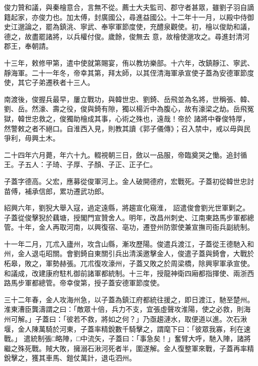 \begin{pinyinscope}
 俊力贊和議，與秦檜意合，言無不從。薦士大夫監司、郡守者甚眾，雖劉子羽自謫籍起家，亦俊力也。加太傅，封廣國公，尋進益國公。十二年十一月，以殿中侍御史江邈論之，罷為鎮洮、寧武、奉寧軍節度使，充醴泉觀使。初，檜以俊助和議，德之，故盡罷諸將，以兵權付俊。歲餘，俊無去
 意，故檜使邈攻之。尋進封清河郡王，奉朝請。



 十三年，敕修甲第，遣中使就第賜宴，侑以教坊樂部。十六年，改鎮靜江、寧武、靜海軍。二十一年冬，帝幸其第，拜太師，以其侄清海軍承宣使子蓋為安德軍節度使，其它子弟遷秩者十三人。



 南渡後，俊握兵最早，屢立戰功，與韓世忠、劉錡、岳飛並為名將，世稱張、韓、劉、岳。然濠、壽之役，俊與錡有隙，獨以楊沂中為腹心，故有濠梁之劫。岳飛冤獄，韓世忠救之，俊獨助檜成其事，心術之殊也，遠哉！帝於
 諸將中眷俊特厚，然警敕之者不絕口。自淮西入見，則教其讀《郭子儀傳》；召入禁中，戒以毋與民爭利，毋興土木。



 二十四年六月薨，年六十九。輟視朝三日，斂以一品服，帝臨奠哭之慟。追封循王。子五人：子琦、子厚、子顏、子正、正子仁。



 子蓋字德高。父宏，應募從俊軍河上。金人破開德府，宏戰死。子蓋初從韓世忠討苗傅，補承信郎，累功遷武功郎。



 紹興六年，劉猊大舉入寇，過定遠縣，將趨宣化窺淮，
 詔遣俊會劉光世軍剿之。子蓋從俊擊猊於藕塘，授閣門宣贊舍人。明年，改昌州刺史、江南東路馬步軍都總管。十年，金人再取河南，以興復宿、亳功，遷登州防禦使兼宣撫司衙兵副統制。



 十一年二月，兀朮入廬州，攻含山縣，漸攻歷陽。俊遣兵渡江，子蓋從王德馳入和州，金人退屯昭關。會劉錡自東關引兵出清溪邀擊金人，俊遣子蓋與錡會，大戰於柘皋，敗之，軍勢赫張。兀朮復攻濠州，子蓋又敗之於周梁橋，除興寧軍承宣使。
 和議成，改建康府駐札御前諸軍都統制。十三年，授龍神衛四廂都指揮使、兩浙西路馬步軍都總管。帝幸俊第，授子蓋安德軍節度使。



 三十二年春，金人攻海州急，以子蓋為鎮江府都統往援之，即日渡江，馳至楚州。淮東漕臣龔濤謂之曰：「敵眾十倍，兵力不支，宜張虛聲攻淮陽，使之必救，則海州可解。」子蓋曰：「彼若不救，將如之何？」乃亟趨漣水，取便道以進。次石湫堰，金人陳萬騎於河東，子蓋率精銳數千騎擊之，謂麾下曰：「彼眾我寡，利在速戰。」
 遣統制張□略陣，□中流矢，子蓋曰：「事急矣！」奮臂大呼，馳入陣，諸將繼之殊死戰。賊大敗，擁溺石湫河死者半，圍遂解。金人復整軍來戰，子蓋再率精銳擊之，獲其車馬、鎧仗萬計，退屯泗州。




\end{pinyinscope}
